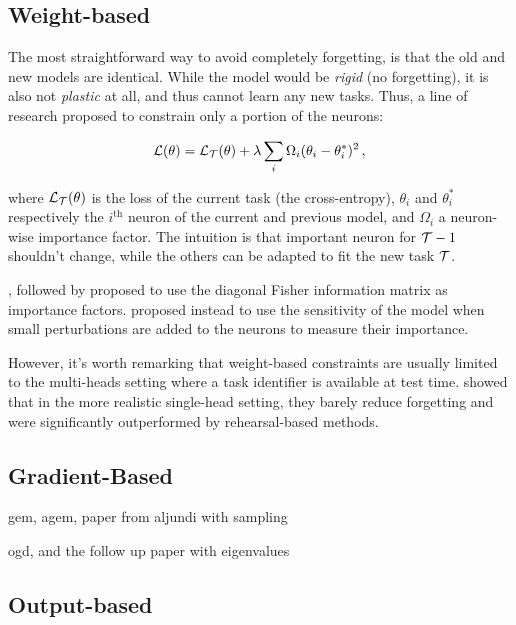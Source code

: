 \subsection{Weight-based}

The most straightforward way to avoid completely forgetting, is that the old and new
models are identical. While the model would be \textit{rigid} (no forgetting), it is also not
\textit{plastic} at all, and thus cannot learn any new tasks. Thus, a line of research proposed to
constrain only a portion of the neurons:

\begin{equation}
    \mathcal{L}(\theta) = \mathcal{L}_{\mathcal{T}}(\theta) + \lambda \sum_i \Omega_i (\theta_i - \theta_i^*)^2\,,
    \label{eq:related_weight_constraint}
\end{equation}

where $\mathcal{L}_{\mathcal{T}}(\theta)$ is the loss of the current task (\eg the cross-entropy), $\theta_i$ and
$\theta_i^*$ respectively the $i^\text{th}$ neuron of the current and previous model, and $\Omega_i$
a neuron-wise importance factor. The intuition is that important neuron for $\mathcal{T}-1$ shouldn't
change, while the others can be adapted to fit the new task $\mathcal{T}$.

\cite{kirkpatrick2017ewc}, followed by
\cite{zenke2017synaptic_intelligence,chaudhry2018riemannien_walk}
proposed to use the diagonal Fisher information matrix as importance factors.
\cite{aljundi2018MemoryAwareSynapses} proposed instead to use the sensitivity of the model when
small perturbations are added to the neurons to measure their importance.

However, it's worth remarking that weight-based constraints are usually limited to the multi-heads
setting where a task identifier is available at test time. \cite{lesort2019regulshortcomings} showed
that in the more realistic single-head setting, they barely reduce forgetting and were significantly
outperformed by rehearsal-based methods.


\subsection{Gradient-Based}

gem, agem, paper from aljundi with sampling

ogd, and the follow up paper with eigenvalues

\subsection{Output-based}

